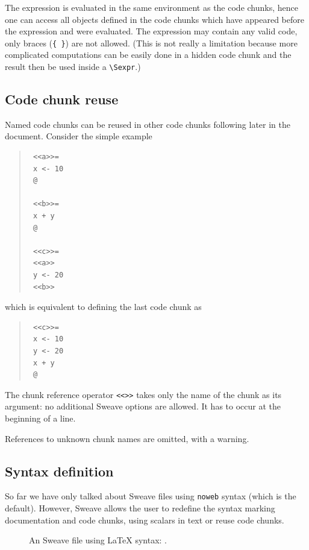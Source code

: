 \documentclass[a4paper]{article}
\begin{document}
The expression is evaluated in the same environment as the code
chunks, hence one can access all objects defined in the code chunks
which have appeared before the expression and were evaluated. The
expression may contain any valid \R{} code, only braces (\verb|{ }|) are
not allowed. (This is not really a limitation because more complicated
computations can be easily done in a hidden code chunk and the result
then be used inside a \verb|\Sexpr|.)

\subsection{Code chunk reuse}

Named code chunks can be reused in other code chunks following later
in the document. Consider the simple example
\begin{quote}%
\begin{verbatim}
 <<a>>=
 x <- 10
 @

 <<b>>=
 x + y
 @

 <<c>>=
 <<a>>
 y <- 20
 <<b>>
\end{verbatim}
\end{quote}
which is equivalent to defining the last code chunk as
\begin{quote}
\begin{verbatim}
 <<c>>=
 x <- 10
 y <- 20
 x + y
 @
\end{verbatim}
\end{quote}

The chunk reference operator \verb|<<>>| takes only the name of the
chunk as its argument: no additional Sweave options are allowed.
It has to occur at the beginning of a line.

References to unknown chunk names are omitted, with a warning.

\subsection{Syntax definition}

So far we have only talked about Sweave files using \texttt{noweb} syntax
(which is the default). However, Sweave allows the user to redefine
the syntax marking documentation and code chunks, using scalars in
text or reuse code chunks.

\begin{figure}[htbp]
  \centering
  \begin{minipage}{0.9\textwidth}
    
  \end{minipage}
  \caption{An Sweave file using \LaTeX{} syntax: .}
  \label{fig:ex1.Stex}
\end{figure}
\end{document}
